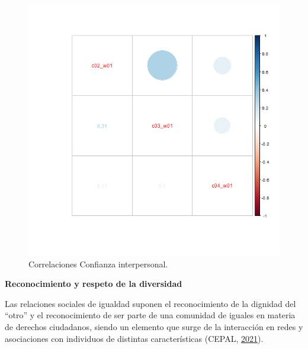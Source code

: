 \documentclass[
  12pt,
]{book}
\begin{document}
\begin{figure}[H]

{\centering \includegraphics[width=1\linewidth,height=1\textheight]{output/graphs/confianza-interpersonal_cor} 

}

\caption{Correlaciones Confianza interpersonal.}\label{fig:confianza-interpersonal-cor}
\end{figure}

\textbf{Reconocimiento y respeto de la diversidad}

Las relaciones sociales de igualdad suponen el reconocimiento de la dignidad del ``otro'' y el reconocimiento de ser parte de una comunidad de iguales en materia de derechos ciudadanos, siendo un elemento que surge de la interacción en redes y asociaciones con individuos de distintas características (CEPAL, \protect\hyperlink{ref-cepal_Cohesion_2021}{2021}).
\end{document}
